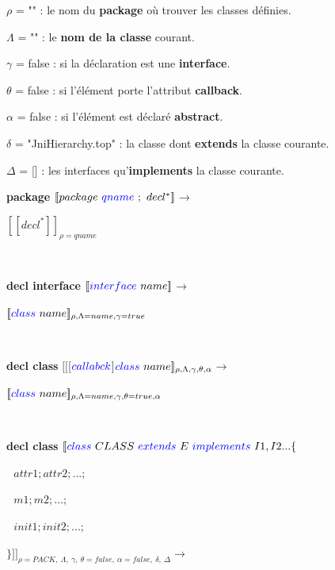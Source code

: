 \documentclass[a4paper, 11pt, notitlepage]{article}
\begin{document}
$\rho$ = "" : le nom du \textbf{package} où trouver les classes définies.

$\Lambda$ = "" : le \textbf{nom de la classe} courant.

$\gamma$ = false : si la déclaration est une \textbf{interface}.

$\theta$ = false : si l'élément porte l'attribut \textbf{callback}.

$\alpha$ = false : si l'élément est déclaré \textbf{abstract}.

$\delta$ = "JniHierarchy.top" : la classe dont \textbf{extends} la classe courante.

$\Delta$ = [] : les interfaces qu'\textbf{implements} la classe courante.
\ %
\newline
\noindent


\textbf{package}
\newline
\noindent
$[\![ package\ {\color{blue}qname}\ ;\ decl^* ]\!]$$\longrightarrow$

$[\![ decl^* ]\!]_{\rho=qname}$ 

\ 
\newline

\textbf{ decl interface }
\newline
\noindent
$[\![{\color{blue}interface}\  name ]\!]$$\longrightarrow$

$[\![{\color{blue}class}\  name ]\!]_{\rho,\Lambda=name,\gamma=true}$

\ 
\newline

\textbf{ decl class }
\newline
\noindent
$[\![$[$ {\color{blue}callabck}$]${\color{blue} class}\  name ]\!]_{\rho,\Lambda,\gamma,\theta,\alpha}$$\longrightarrow$

$[\![{\color{blue}class}\  name ]\!]_{\rho,\Lambda=name,\gamma,\theta=true,\alpha}$

\ 
\newpage
\noindent

\textbf{ decl class}
\newline
\noindent
$[\![ {\color{blue}class}\ CLASS\ 
 {\color{blue}extends}\  E \ 
 {\color{blue}implements}\  I1,I2... \{$

 $ \ \ \ attr1; attr2; ...;$

  $\ \ \ m1; m2; ...;$

  $\ \ \ init1; init2; ...;$

 $\} ]\!]_{\rho=PACK,\ \Lambda,\ \gamma,\ \theta=false,\ \alpha=false,\ \delta,\ \Delta}\longrightarrow$
\ 
\newline
\end{document}
